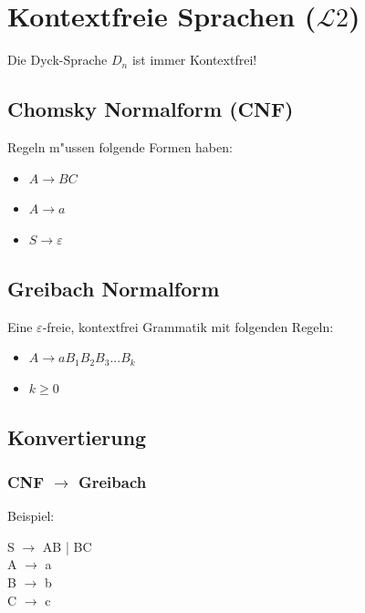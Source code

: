 \documentclass[11pt, a4paper]{scrartcl}
\begin{document}
\newpage


\section{Kontextfreie Sprachen ($\mathcal{L}2 $)}

Die Dyck-Sprache $D_n$ ist immer Kontextfrei!

\subsection{Chomsky Normalform (CNF)}

Regeln m"ussen folgende Formen haben:

\begin{itemize}
    \item $A \rightarrow BC$
    \item $A \rightarrow a$
    \item $S \rightarrow \varepsilon$
\end{itemize}

\subsection{Greibach Normalform}

Eine $\varepsilon$-freie, kontextfrei Grammatik mit folgenden Regeln:

\begin{itemize}
    \item $A \rightarrow aB_1B_2B_3...B_k$
    \item $k \geq 0$
\end{itemize}

\subsection{Konvertierung}

\subsubsection{CNF $\rightarrow$ Greibach}

Beispiel:

\vspace{0.5em}

S $\rightarrow$ AB | BC \\
A $\rightarrow$ a \\
B $\rightarrow$ b \\
C $\rightarrow$ c \\
\end{document}

